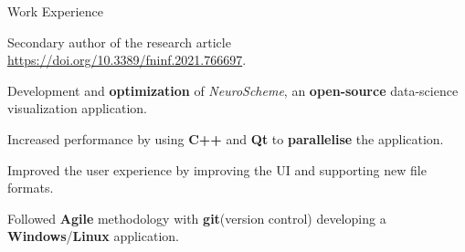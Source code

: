 \documentclass{resume} %
\begin{document}
\begin{mainSection}{Work Experience}
\begin{multiWorkExperience}
\item Secondary author of the research article \url{https://doi.org/10.3389/fninf.2021.766697}.

\item Development and \textbf{optimization} of \textit{NeuroScheme}, an \textbf{open-source} data-science visualization application.

\item Increased performance by using \textbf{C++} and \textbf{Qt} to \textbf{parallelise} the application.

\item Improved the user experience by improving the UI and supporting new file formats.

\item Followed \textbf{Agile} methodology with \textbf{git}(version control) developing a \textbf{Windows}/\textbf{Linux} application.
\end{multiWorkExperience}
\end{mainSection}
\end{document}
